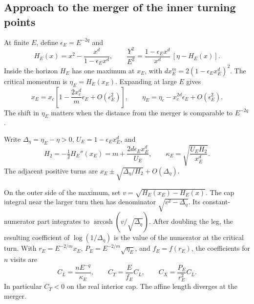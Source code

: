 \subsection{Approach to the merger of the inner turning points}
\label{sec:critical-transverse-geodesic}

At finite \(E\), define \(\epsilon_E=E^{-2q}\) and
\begin{equation}
 H_E(x)=x^2-\frac{x^d}{1-\epsilon_E x^d},\qquad
 \frac{Y^2}{E^2}=\frac{1-\epsilon_E x^d}{x^d}\,[\eta-H_E(x)] .
\end{equation}
Inside the horizon \(H_E\) has one maximum at \(x_E\), with
\(d x_E^m=2(1-\epsilon_E x_E^d)^2\). The critical momentum
is \(\eta_E=H_E(x_E)\). Expanding at large \(E\) gives
\begin{equation}
 x_E=x_c\left[1-\frac{2x_c^d}{m}\epsilon_E
                       +O(\epsilon_E^2)\right],\qquad
 \eta_E=\eta_c-x_c^{2d}\epsilon_E+O(\epsilon_E^2).
 \label{eq:critical-momentum-shift}
\end{equation}
The shift in \(\eta_E\) matters when the distance from the
merger is comparable to \(E^{-2q}\).

Write \(\Delta_\eta=\eta_E-\eta>0\),
\(U_E=1-\epsilon_E x_E^d\), and
\begin{equation}
 H_2=-\tfrac12 H_E''(x_E)=m+\frac{2d\epsilon_E x_E^d}{U_E},
 \qquad \kappa_E=\sqrt{\frac{U_E H_2}{x_E^d}} .
\end{equation}
The adjacent positive turns are
\(x_E\pm\sqrt{\Delta_\eta/H_2}+O(\Delta_\eta)\).

On the outer side of the maximum, set
\(v=\sqrt{H_E(x_E)-H_E(x)}\). The cap integral near the
larger turn then has denominator \(\sqrt{v^2-\Delta_\eta}\).
Its constant-numerator part integrates to
\(\operatorname{arcosh}(v/\sqrt{\Delta_\eta})\). After doubling
the leg, the resulting coefficient of \(\log(1/\Delta_\eta)\)
is the value of the numerator at the critical turn. With
\(r_E=E^{-2/m}x_E\), \(P_E=E^{-2/m}\sqrt{\eta_E}\), and
\(f_E=f(r_E)\), the coefficients for \(n\) visits are
\begin{equation}
 C_L=\frac{n E^{-q}}{\kappa_E},\qquad
 C_T=\frac{E}{f_E}C_L,\qquad C_X=\frac{P_E}{r_E^2}C_L .
 \label{eq:critical-log-coefficients}
\end{equation}
In particular \(C_T<0\) on the real interior cap. The affine
length diverges at the merger.

